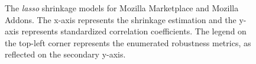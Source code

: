 \begin{figure}[tbp!] 
\centering     %
{}
  \captionsetup{justification=justified,
singlelinecheck=false}
\caption{The \textit{lasso} shrinkage models for Mozilla Marketplace and Mozilla Addons. The x-axis represents the shrinkage estimation and the y-axis represents standardized correlation coefficients. The legend on the top-left corner represents the enumerated robustness metrics, as reflected on the secondary y-axis. }
\label{fig:lasso2}
\end{figure} 

